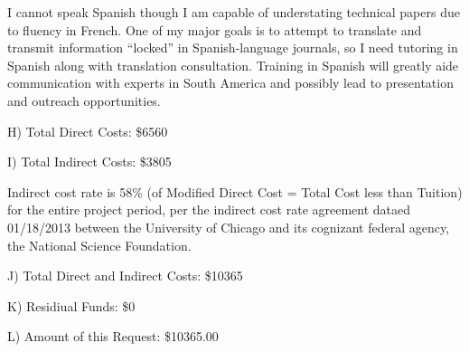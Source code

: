 \documentclass[11pt,letterpaper]{article}
\begin{document}
I cannot speak Spanish though I am capable of understating technical papers due to fluency in French. One of my major goals is to attempt to translate and transmit information ``locked'' in Spanish-language journals, so I need tutoring in Spanish along with translation consultation. Training in Spanish will greatly aide communication with experts in South America and possibly lead to presentation and outreach opportunities.


H) Total Direct Costs: \$6560

I) Total Indirect Costs: \$3805

Indirect cost rate is 58\% (of Modified Direct Cost = Total Cost less than Tuition) for the entire project period, per the indirect cost rate agreement dataed 01/18/2013 between the University of Chicago and its cognizant federal agency, the National Science Foundation.


J) Total Direct and Indirect Costs: \$10365

K) Residiual Funds: \$0

L) Amount of this Request: \$10365.00
\end{document}

